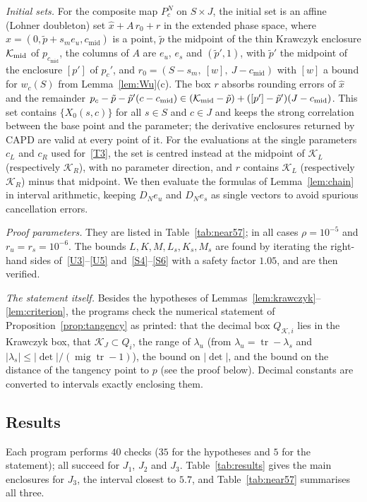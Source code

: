 \documentclass[11pt]{amsart}
\theoremstyle{definition}
\theoremstyle{remark}
\newcommand{\mig}{\operatorname{mig}}
\newcommand{\ival}[1]{[#1]}
\newcommand{\eu}{e_u}
\newcommand{\es}{e_s}
\newcommand{\cmid}{c_{\mathrm{mid}}}
\newcommand{\Kr}{\mathcal{K}}
\begin{document}
\emph{Initial sets.} For the composite map $P_c^N$ on $S\times J$, the initial set is an affine (Lohner
doubleton) set $\hat x+A\,r_0+r$ in the extended phase space, where $\hat x=(0,\tilde p+s_m\eu,\cmid)$ is a
point, $\tilde p$ the midpoint of the thin Krawczyk enclosure $\Kr_{\rm mid}$ of $p_{\cmid}$, the columns of
$A$ are $\eu$, $\es$ and $(\tilde p',1)$, with $\tilde p'$ the midpoint of the enclosure $\ival{p'}$ of $p_c'$,
and $r_0=(S-s_m,\ \ival{w},\ J-\cmid)$ with $\ival w$ a bound for $w_c(S)$ from Lemma~\ref{lem:Wu}(c). The
box $r$ absorbs rounding errors of $\hat x$ and the remainder
$p_c-\tilde p-\tilde p'(c-\cmid)\in(\Kr_{\rm mid}-\tilde p)+(\ival{p'}-\tilde p')(J-\cmid)$. This set contains
$\{X_0(s,c)\}$ for all $s\in S$ and $c\in J$ and keeps the strong correlation between the base point and the
parameter; the derivative enclosures returned by CAPD are valid at every point of it. For the evaluations
at the single parameters $c_L$ and $c_R$ used for~\ref{T3}, the set is centred instead at the midpoint of
$\Kr_L$ (respectively $\Kr_R$), with no parameter direction, and $r$ contains $\Kr_L$ (respectively $\Kr_R$)
minus that midpoint. We then evaluate the formulas of Lemma~\ref{lem:chain} in interval arithmetic, keeping
$D_N\eu$ and $D_N\es$ as single vectors to avoid spurious cancellation errors.

\emph{Proof parameters.} They are listed in Table~\ref{tab:near57}; in all cases $\rho=10^{-5}$ and
$r_u=r_s=10^{-6}$. The bounds $L,K,M,L_s,K_s,M_s$ are found by iterating the right-hand sides
of~\ref{U3}--\ref{U5} and~\ref{S4}--\ref{S6} with a safety factor $1.05$, and are then verified.

\emph{The statement itself.} Besides the hypotheses of Lemmas~\ref{lem:krawczyk}--\ref{lem:criterion}, the
programs check the numerical statement of Proposition~\ref{prop:tangency} as printed: that the decimal box $Q_{\Kr,i}$
lies in the Krawczyk box, that $\Kr_J\subset Q_i$, the range of $\lambda_u$ (from
$\lambda_u=\operatorname{tr}-\lambda_s$ and $|\lambda_s|\le|\det|/(\mig\operatorname{tr}-1)$), the bound on
$|\det|$, and the bound on the distance of the tangency point to $p$ (see the proof below). Decimal
constants are converted to intervals exactly enclosing them.

\subsection{Results}
Each program performs $40$ checks ($35$ for the hypotheses and $5$ for the statement); all succeed for
$J_1$, $J_2$ and $J_3$. Table~\ref{tab:results} gives the main enclosures for $J_3$, the interval closest
to $5.7$, and Table~\ref{tab:near57} summarises all three.
\end{document}
